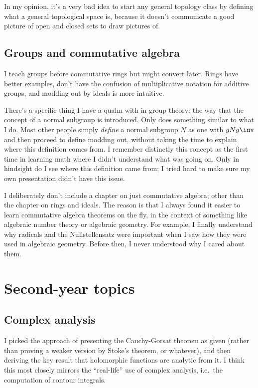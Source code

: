 In my opinion, it's a very bad idea to start any general topology class
by defining what a general topological space is,
because it doesn't communicate a good picture of open and closed sets
to draw pictures of.

\subsection{Groups and commutative algebra}
I teach groups before commutative rings but might convert later.
Rings have better examples, don't have the confusion of multiplicative
notation for additive groups, and modding out by ideals is more intuitive.

There's a specific thing I have a qualm with in group theory:
the way that the concept of a normal subgroup is introduced.
Only \cite{ref:gowers} does something similar to what I do.
Most other people simply \emph{define} a normal subgroup $N$
as one with $gNg\inv$ and then proceed to define modding out,
without taking the time to explain where this definition comes from.
I remember distinctly this concept as the first time in learning math
where I didn't understand what was going on.
Only in hindsight do I see where this definition came from;
I tried hard to make sure my own presentation didn't have this issue.

I deliberately don't include a chapter on just commutative algebra;
other than the chapter on rings and ideals.
The reason is that I always found it easier to learn
commutative algebra theorems on the fly,
in the context of something like algebraic number theory or algebraic geometry.
For example, I finally understand why radicals and the Nullstellensatz were important
when I saw how they were used in algebraic geometry.
Before then, I never understood why I cared about them.


\section{Second-year topics}
\subsection{Complex analysis}
I picked the approach of presenting the Cauchy-Gorsat theorem as given
(rather than proving a weaker version by Stoke's theorem, or whatever),
and then deriving the key result that holomorphic functions are analytic
from it.
I think this most closely mirrors the ``real-life'' use of complex
analysis, i.e.\ the computation of contour integrals.

